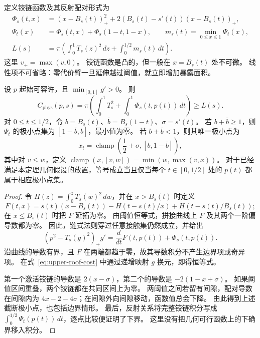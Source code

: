 定义铰链函数及其反射配对形式为
\begin{align}
 \Phi_s(t,x)&=(x-B_s(t))_+^2
             +2(B_s(t)-s'(t))(x-B_s(t))_+,\\
 \Psi_t(x)&=\Phi_s(t,x)+\Phi_s(1-t,1-x),
 \qquad m_s(t)=\min_{0\le x\le1}\Psi_t(x),\\
 L(s)&=\pi\left(\int_0^1T_s(z)^2\,dz+
                         \int_0^{1/2}m_s(t)\,dt\right).
\end{align}
这里 $v_+=\max(v,0)$。
铰链函数是凸的，但一般在 $x=B_s(t)$ 处不可微。
线性项不可省略：零代价臂一旦延伸越过阈值，就立即增加暴露面积。

\begin{theorem}[铰链比较及几何等号条件]\label{thm:upper-hinge}
设 $p$ 起始可容许，且 $\min_{[0,1]}g'>0$。
则
\begin{equation}\label{eq:upper-hinge-identity}
 C_{\mathrm{phys}}(p,s)=\pi\left(\int_0^1T_s^2+
                                      \int_0^1\Phi_s(t,p(t))\,dt\right)
 \ge L(s).
\end{equation}
对 $0\le t\le1/2$，令 $b=B_s(t)$、$\bar b=B_s(1-t)$、$\sigma=s'(t)$。
若 $b+\bar b\ge1$，则 $\Psi_t$ 的极小点集为 $[1-\bar b,b]$，最小值为零。
若 $b+\bar b<1$，则其唯一极小点为
\[
 x_t=\operatorname{clamp}\left(\frac12+\sigma,[b,1-\bar b]\right),
\]
其中对 $v\le w$，定义 $\operatorname{clamp}(x,[v,w])=\min(w,\max(v,x))$。
对于已经满足本定理几何假设的放置，等号成立当且仅当每个 $t\in[0,1/2]$ 处的 $p(t)$ 都属于相应极小点集。
\end{theorem}

\begin{proof}
令 $H(z)=\int_0^zT_s(w)^2\,dw$，并在 $x>B_s(t)$ 时定义
\[
 F(t,x)=s(t)(x-B_s(t))-H(t-s(t)/x)
                         +H(t-s(t)/B_s(t));
\]
在 $x\le B_s(t)$ 时把 $F$ 延拓为零。
由阈值恒等式，拼接曲线上 $F$ 及其两个一阶偏导数都为零。
因此，链式法则穿过任意接触集仍然成立，并给出
\begin{equation}\label{eq:upper-primitive}
 (p^2-T_s(g)^2)_+g'
       =\frac{d}{dt}F(t,p(t))+\Phi_s(t,p(t)).
\end{equation}
沿曲线的导数有界，且 $F$ 在两端都趋于零，故其导数积分不产生边界项或奇异项。
在式~\eqref{eq:upper-roof-cost} 中通过递增映射 $g$ 换元，即得恒等式。

第一个激活铰链的导数是 $2(x-\sigma)$，第二个的导数是 $-2(1-x+\sigma)$。
如果阈值区间重叠，两个铰链都在共同区间上为零。
两阈值之间若留有间隙，配对导数在间隙内为 $4x-2-4\sigma$；在间隙外向间隙移动，函数值总会下降。
由此得到上述截断极小点，也包括边界情形。
最后，反射关系将完整铰链积分写成 $\int_0^{1/2}\Psi_t(p(t))\,dt$，逐点比较便证明了下界。
这里没有把几何可行函数上的下确界移入积分。
\end{proof}

